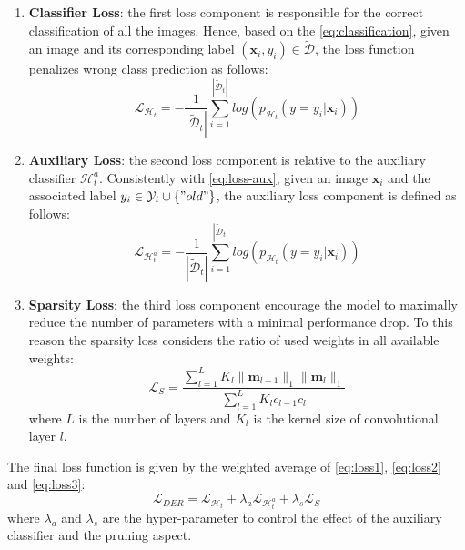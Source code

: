 \begin{enumerate}
    \item \textbf{Classifier Loss}: the first loss component is responsible for the correct classification of all the images. Hence, based on the \autoref{eq:classification}, given an image and its corresponding label $(\textbf{x}_i, y_i)\in \tilde{\mathcal{D}}$, the loss function penalizes wrong class prediction as follows:
    \begin{equation} \label{eq:loss1}
        \mathcal{L}_{\mathcal{H}_t} = - \frac{1}{|\tilde{\mathcal{D}}_t|}
            \sum_{i=1}^{|\tilde{\mathcal{D}}_t|}log(p_{\mathcal{H}_t}(y=y_i | \textbf{x}_i))
    \end{equation}
    \item \textbf{Auxiliary Loss}: the second loss component is relative to the auxiliary classifier $\mathcal{H}_t^a$. Consistently with \autoref{eq:loss-aux}, given an image $\textbf{x}_i$ and the associated label $y_i \in \mathcal{Y}_i \cup \{"old"\}$, the auxiliary loss component is defined as follows:
    \begin{equation} \label{eq:loss2}
        \mathcal{L}_{\mathcal{H}_t^a} = - \frac{1}{|\tilde{\mathcal{D}}_t|}
            \sum_{i=1}^{|\tilde{\mathcal{D}}_t|}log(p_{\mathcal{H}_t}(y=y_i | \textbf{x}_i))
    \end{equation}
    \item \textbf{Sparsity Loss}: the third loss component encourage the model to maximally reduce the number of parameters with a minimal performance drop. To this reason the sparsity loss considers the ratio of used weights in all available weights:
    \begin{equation} \label{eq:loss3}
        \mathcal{L}_S = \frac{\sum_{l=1}^L K_l \| \textbf{m}_{l-1} \|_1  \| \textbf{m}_{l} \|_1 }{\sum_{l=1}^L K_l c_{l-1} c_{l}}
    \end{equation}
    where $L$ is the number of layers and $K_l$ is the kernel size of convolutional layer $l$.
\end{enumerate}

The final loss function is given by the weighted average of \autoref{eq:loss1}, \autoref{eq:loss2} and \autoref{eq:loss3}:
\begin{equation}\label{eq:final_der_loss}
    \mathcal{L}_{DER} = \mathcal{L}_{\mathcal{H}_t} + \lambda_a \mathcal{L}_{\mathcal{H}_t^a} + \lambda_s \mathcal{L}_{S}
\end{equation}
where $\lambda_a$ and $\lambda_s$ are the hyper-parameter to control the effect of the auxiliary classifier and the pruning aspect.

